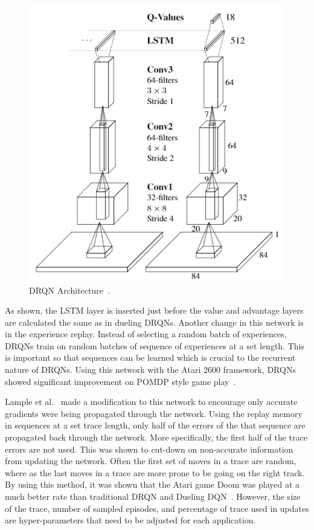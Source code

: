 \documentclass[12pt,american]{report}
\begin{document}
\begin{figure}
\centering
\includegraphics[scale=1]{images/drqn-arch.png}
\caption{DRQN Architecture~\cite{HausknechtDRQN}.}
\label{fig:drqn-arch}
\end{figure}

As shown, the LSTM layer is inserted just before the value and advantage layers are calculated the same as in dueling DRQNs. Another change in this network is in the experience replay.  Instead of selecting a random batch of experiences, DRQNs train on random batches of sequence of experiences at a set length.  This is important so that sequences can be learned which is crucial to the recurrent nature of DRQNs. Using this network with the Atari 2600 framework, DRQNs showed significant improvement on POMDP style game play~\cite{HausknechtDRQN}. 

Lample et al.~\cite{DBLP:journals/corr/LampleC16} made a modification to this network to encourage only accurate gradients were being propagated through the network. Using the replay memory in sequences at a set trace length, only half of the errors of the that sequence are propagated back through the network.  More specifically, the first half of the trace errors are not used.  This was shown to cut-down on non-accurate information from updating the network.  Often the first set of moves in a trace are random, where as the last moves in a trace are more prone to be going on the right track.  By using this method, it was shown that the Atari game Doom was played at a much better rate than traditional DRQN and Dueling DQN~\cite{DBLP:journals/corr/LampleC16}.  However, the size of the trace, number of sampled episodes, and percentage of trace used in updates are hyper-parameters that need to be adjusted for each application.
\end{document}
